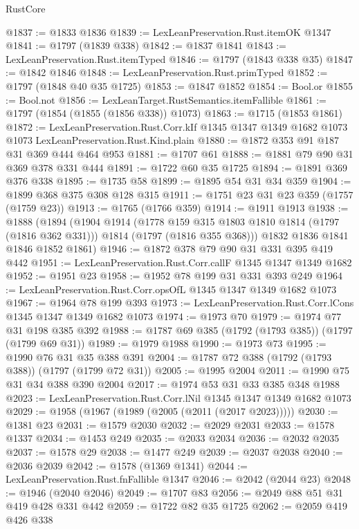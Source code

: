 \begin{lexlean}{RustCore}
\begin{coremodule}
@1837 := @1833 @1836
@1839 := LexLeanPreservation.Rust.itemOK @1347
@1841 := @1797 (@1839 @338)
@1842 := @1837 @1841
@1843 := LexLeanPreservation.Rust.itemTyped
@1846 := @1797 (@1843 @338 @35)
@1847 := @1842 @1846
@1848 := LexLeanPreservation.Rust.primTyped
@1852 := @1797 (@1848 @40 @35 @1725)
@1853 := @1847 @1852
@1854 := Bool.or
@1855 := Bool.not
@1856 := LexLeanTarget.RustSemantics.itemFallible
@1861 := @1797 (@1854 (@1855 (@1856 @338)) @1073)
@1863 := @1715 (@1853 @1861)
@1872 := LexLeanPreservation.Rust.Corr.kIf
    @1345
    @1347
    @1349
    @1682
    @1073
    @1073
    LexLeanPreservation.Rust.Kind.plain
@1880 := @1872 @353 @91 @187 @31 @369 @444 @464 @953
@1881 := @1707 @61
@1888 := @1881 @79 @90 @31 @369 @378 @331 @444
@1891 := @1722 @60 @35 @1725
@1894 := @1891 @369 @376 @338
@1895 := @1735 @58
@1899 := @1895 @54 @31 @34 @359
@1904 := @1899 @368 @375 @308 @128 @315
@1911 := @1751 @23 @31 @23 @359 (@1757 (@1759 @23))
@1913 := @1765 (@1766 @359)
@1914 := @1911 @1913
@1938 := @1888
    (@1894
      (@1904
        @1914
        (@1778 @159 @315 @1803 @1810 @1814 (@1797 (@1816 @362 @331)))
        @1814
        (@1797 (@1816 @355 @368)))
      @1832
      @1836
      @1841
      @1846
      @1852
      @1861)
@1946 := @1872 @378 @79 @90 @31 @331 @395 @419 @442
@1951 := LexLeanPreservation.Rust.Corr.callF @1345 @1347 @1349 @1682
@1952 := @1951 @23
@1958 := @1952 @78 @199 @31 @331 @393 @249
@1964 := LexLeanPreservation.Rust.Corr.opsOfL @1345 @1347 @1349 @1682 @1073
@1967 := @1964 @78 @199 @393
@1973 := LexLeanPreservation.Rust.Corr.lCons @1345 @1347 @1349 @1682 @1073
@1974 := @1973 @70
@1979 := @1974 @77 @31 @198 @385 @392
@1988 := @1787 @69 @385 (@1792 (@1793 @385)) (@1797 (@1799 @69 @31))
@1989 := @1979 @1988
@1990 := @1973 @73
@1995 := @1990 @76 @31 @35 @388 @391
@2004 := @1787 @72 @388 (@1792 (@1793 @388)) (@1797 (@1799 @72 @31))
@2005 := @1995 @2004
@2011 := @1990 @75 @31 @34 @388 @390 @2004
@2017 := @1974 @53 @31 @33 @385 @348 @1988
@2023 := LexLeanPreservation.Rust.Corr.lNil @1345 @1347 @1349 @1682 @1073
@2029 := @1958 (@1967 (@1989 (@2005 (@2011 (@2017 @2023)))))
@2030 := @1381 @23
@2031 := @1579 @2030
@2032 := @2029 @2031
@2033 := @1578 @1337
@2034 := @1453 @249
@2035 := @2033 @2034
@2036 := @2032 @2035
@2037 := @1578 @29
@2038 := @1477 @249
@2039 := @2037 @2038
@2040 := @2036 @2039
@2042 := @1578 (@1369 @1341)
@2044 := LexLeanPreservation.Rust.fnFallible @1347
@2046 := @2042 (@2044 @23)
@2048 := @1946 (@2040 @2046)
@2049 := @1707 @83
@2056 := @2049 @88 @51 @31 @419 @428 @331 @442
@2059 := @1722 @82 @35 @1725
@2062 := @2059 @419 @426 @338

\end{coremodule}
\end{lexlean}

